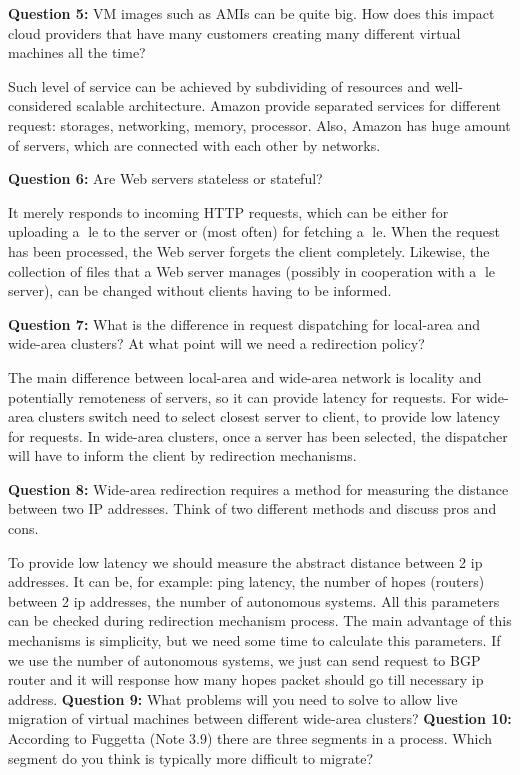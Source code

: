 \documentclass[12pt,a4paper]{report}
\begin{document}
\bigbreak
\textbf{Question 5:} VM images such as AMIs can be quite big. How does this impact cloud providers that have many customers creating many different virtual machines all the time?

Such level of service can be achieved by subdividing of resources and well-considered scalable architecture. Amazon provide separated services for different request: storages, networking, memory, processor. Also, Amazon has huge amount of servers, which are connected with each other by networks.

\textbf{Question 6:} Are Web servers stateless or stateful?

It merely responds to incoming HTTP requests, which can be either for uploading a le to the server or (most often) for fetching a le. When the request has been processed, the Web server forgets the client completely. Likewise, the collection of files that a Web server manages (possibly in cooperation with a le server), can be changed without clients having to be informed.

\textbf{Question 7:} What is the difference in request dispatching for local-area and wide-area clusters? At what point will we need a redirection policy?

The main difference between local-area and wide-area network is locality and potentially remoteness of servers, so it can provide latency for requests. For wide-area clusters switch need to select closest server to client, to provide low latency for requests. In wide-area clusters, once a server has been selected, the dispatcher will have to inform the client by redirection mechanisms.

\textbf{Question 8:} Wide-area redirection requires a method for measuring the distance between two IP addresses. Think of two different methods and discuss pros and cons.

To provide low latency we should measure the abstract distance between 2 ip addresses. It can be, for example: ping latency, the number of hopes (routers) between 2 ip addresses, the number of autonomous systems. All this parameters can be checked during redirection mechanism process. The main advantage of this mechanisms is simplicity, but we need some time to calculate this parameters. If we use the number of autonomous systems, we just can send request to BGP router and it will response how many hopes packet should go till necessary ip address.
\bigbreak
\textbf{Question 9:} What problems will you need to solve to allow live migration of virtual machines between different wide-area clusters?
\bigbreak
\textbf{Question 10:} According to Fuggetta (Note 3.9) there are three segments in a process. Which segment do you think is typically more difficult to migrate?
\end{document}
